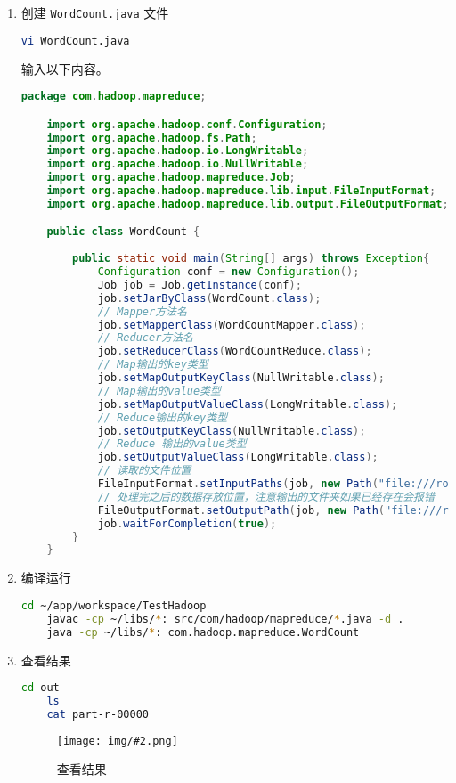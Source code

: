 \documentclass{article}
\newenvironment{enum}{
    \begin{enumerate}[label=(\arabic*), noitemsep]
}{
    \end{enumerate}
}
\newcommand{\img}[3][0.9]{%
    \begin{figure}[H]
        \centering
        \texttt{[image: img/\#2.png]}
        \caption{#3}
    \end{figure}
}
\begin{document}
\begin{enum}
\item 创建 \texttt{WordCount.java} 文件

\begin{lstlisting}[language=bash]
    vi WordCount.java
\end{lstlisting}

输入以下内容。

\begin{lstlisting}[language=java]
    package com.hadoop.mapreduce;

    import org.apache.hadoop.conf.Configuration;
    import org.apache.hadoop.fs.Path;
    import org.apache.hadoop.io.LongWritable;
    import org.apache.hadoop.io.NullWritable;
    import org.apache.hadoop.mapreduce.Job;
    import org.apache.hadoop.mapreduce.lib.input.FileInputFormat;
    import org.apache.hadoop.mapreduce.lib.output.FileOutputFormat;

    public class WordCount {
        
        public static void main(String[] args) throws Exception{
            Configuration conf = new Configuration();
            Job job = Job.getInstance(conf);
            job.setJarByClass(WordCount.class);
            // Mapper方法名
            job.setMapperClass(WordCountMapper.class);
            // Reducer方法名
            job.setReducerClass(WordCountReduce.class);
            // Map输出的key类型
            job.setMapOutputKeyClass(NullWritable.class);
            // Map输出的value类型
            job.setMapOutputValueClass(LongWritable.class);
            // Reduce输出的key类型
            job.setOutputKeyClass(NullWritable.class);
            // Reduce 输出的value类型
            job.setOutputValueClass(LongWritable.class);
            // 读取的文件位置
            FileInputFormat.setInputPaths(job, new Path("file:///root/app/workspace/TestHadoop/word.txt"));
            // 处理完之后的数据存放位置，注意输出的文件夹如果已经存在会报错
            FileOutputFormat.setOutputPath(job, new Path("file:///root/app/workspace/TestHadoop/out"));
            job.waitForCompletion(true);
        }
    }
\end{lstlisting}

\item 编译运行

\begin{lstlisting}[language=bash]
    cd ~/app/workspace/TestHadoop
    javac -cp ~/libs/*: src/com/hadoop/mapreduce/*.java -d .
    java -cp ~/libs/*: com.hadoop.mapreduce.WordCount
\end{lstlisting}

\item 查看结果

\begin{lstlisting}[language=bash]
    cd out
    ls
    cat part-r-00000
\end{lstlisting}

\img{8.2.1}{查看结果}

\end{enum}
\end{document}
